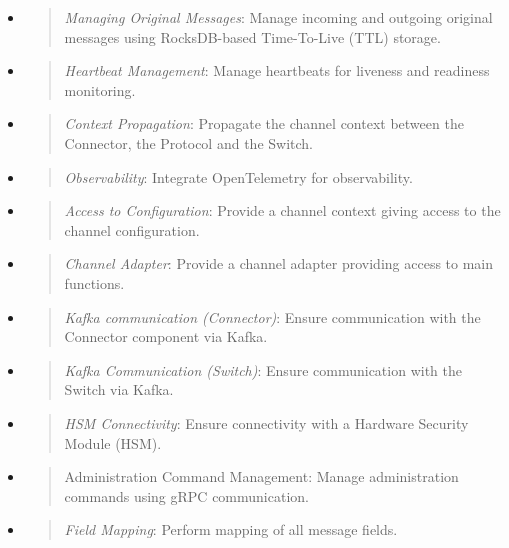 \documentclass[12pt,a4paper]{report}
\begin{document}
\begin{itemize}
\item
  \begin{quote}
  \emph{Managing Original Messages}: Manage incoming and outgoing
  original messages using RocksDB-based Time-To-Live (TTL) storage.
  \end{quote}
\item
  \begin{quote}
  \emph{Heartbeat Management}: Manage heartbeats for liveness and
  readiness monitoring.
  \end{quote}
\item
  \begin{quote}
  \emph{Context Propagation}: Propagate the channel context between the
  Connector, the Protocol and the Switch.
  \end{quote}
\item
  \begin{quote}
  \emph{Observability}: Integrate OpenTelemetry for observability.
  \end{quote}
\item
  \begin{quote}
  \emph{Access to Configuration}: Provide a channel context giving
  access to the channel configuration.
  \end{quote}
\item
  \begin{quote}
  \emph{Channel Adapter}: Provide a channel adapter providing access to
  main functions.
  \end{quote}
\item
  \begin{quote}
  \emph{Kafka communication (Connector)}: Ensure communication with the
  Connector component via Kafka.
  \end{quote}
\item
  \begin{quote}
  \emph{Kafka Communication (Switch)}: Ensure communication with the
  Switch via Kafka.
  \end{quote}
\item
  \begin{quote}
  \emph{HSM Connectivity}: Ensure connectivity with a Hardware Security
  Module (HSM).
  \end{quote}
\item
  \begin{quote}
  Administration Command Management: Manage administration commands
  using gRPC communication.
  \end{quote}
\item
  \begin{quote}
  \emph{Field Mapping}: Perform mapping of all message fields.
  \end{quote}
\end{itemize}
\end{document}
